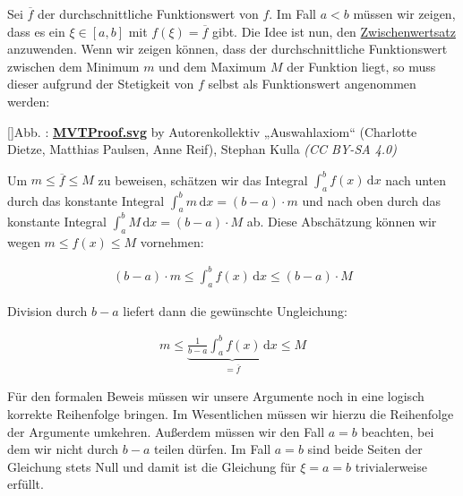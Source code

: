 \documentclass[fontsize=9pt,
               parskip=half-,
               DIV=14,
               listof=chapterentry,
               tocflat]{scrbook}
\newcounter{imagelabel}
\begin{document}
\begin{solutionprocess*}
Sei ${\overline {f}}$ der durchschnittliche Funktionswert von $f$. Im Fall $a<b$ müssen wir zeigen, dass es ein $\xi \in [a,b]$ mit $f(\xi )={\overline {f}}$ gibt. Die Idee ist nun, den \href{https://de.wikibooks.org/wiki/Mathe\_für\_Nicht-Freaks:\_Zwischenwertsatz}
{Zwischenwertsatz} anzuwenden. Wenn wir zeigen können, dass der durchschnittliche Funktionswert zwischen dem Minimum $m$ und dem Maximum $M$ der Funktion liegt, so muss dieser aufgrund der Stetigkeit von $f$ selbst als Funktionswert angenommen werden:

[]{Abb. : \protect\href{https://commons.wikimedia.org/wiki/File:MVTProof.svg}{\textbf{MVTProof.svg}} by Autorenkollektiv „Auswahlaxiom“ (Charlotte Dietze, Matthias Paulsen, Anne Reif), Stephan Kulla \textit{(CC BY-SA 4.0)}}\begin{center}
\end{center}

Um $m\leq {\overline {f}}\leq M$ zu beweisen, schätzen wir das Integral $\int _{a}^{b}f(x)\,\mathrm {d} x$ nach unten durch das konstante Integral $\int _{a}^{b}m\,\mathrm {d} x=(b-a)\cdot m$ und nach oben durch das konstante Integral $\int _{a}^{b}M\,\mathrm {d} x=(b-a)\cdot M$ ab. Diese Abschätzung können wir wegen $m\leq f(x)\leq M$ vornehmen:

\begin{align*}
(b-a)\cdot m\leq \int _{a}^{b}f(x)\,\mathrm {d} x\leq (b-a)\cdot M
\end{align*}

Division durch $b-a$ liefert dann die gewünschte Ungleichung:

\begin{align*}
m\leq \underbrace {{\frac {1}{b-a}}\int _{a}^{b}f(x)\,\mathrm {d} x} _{={\overline {f}}}\leq M
\end{align*}

Für den formalen Beweis müssen wir unsere Argumente noch in eine logisch korrekte Reihenfolge bringen. Im Wesentlichen müssen wir hierzu die Reihenfolge der Argumente umkehren. Außerdem müssen wir den Fall $a=b$ beachten, bei dem wir nicht durch $b-a$ teilen dürfen. Im Fall $a=b$ sind beide Seiten der Gleichung stets Null und damit ist die Gleichung für $\xi =a=b$ trivialerweise erfüllt.

\end{solutionprocess*}
\end{document}
